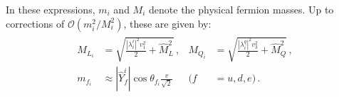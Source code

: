 In these expressions, $m_i$ and $M_i$ denote the physical fermion masses. Up to corrections of $\mathcal{O}(m_i^2 / M_i^2)$, these are given by:
\begin{align}\label{eq:ferm_masses}
\begin{aligned}
M_{L_i} &= \sqrt{\frac{|\lambda_i^\ell|^2 v_1^2}{2} + \hat M_L^2}\,, &
M_{Q_i} &= \sqrt{\frac{|\lambda_i^q|^2 v_3^2}{2} + \hat M_Q^2}\,, \\[2pt]
m_{f_i} &\approx |\hat Y_f^i| \cos\theta_{f_i} \frac{v}{\sqrt{2}} & (f &= u, d, e)\,.
\end{aligned}
\end{align}


